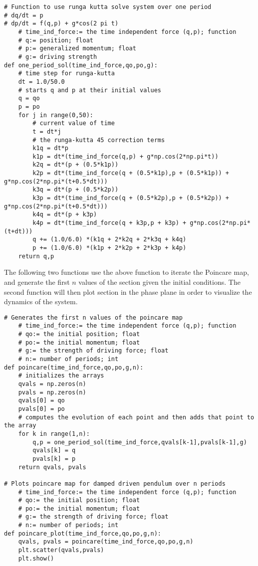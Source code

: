 \documentclass{article}
\begin{document}
\begin{lstlisting}
# Function to use runga kutta solve system over one period
# dq/dt = p
# dp/dt = f(q,p) + g*cos(2 pi t)
    # time_ind_force:= the time independent force (q,p); function
    # q:= position; float
    # p:= generalized momentum; float
    # g:= driving strength
def one_period_sol(time_ind_force,qo,po,g):
    # time step for runga-kutta
    dt = 1.0/50.0
    # starts q and p at their initial values
    q = qo
    p = po
    for j in range(0,50):
        # current value of time
        t = dt*j
        # the runga-kutta 45 correction terms
        k1q = dt*p
        k1p = dt*(time_ind_force(q,p) + g*np.cos(2*np.pi*t))
        k2q = dt*(p + (0.5*k1p))
        k2p = dt*(time_ind_force(q + (0.5*k1p),p + (0.5*k1p)) + g*np.cos(2*np.pi*(t+0.5*dt)))
        k3q = dt*(p + (0.5*k2p))
        k3p = dt*(time_ind_force(q + (0.5*k2p),p + (0.5*k2p)) + g*np.cos(2*np.pi*(t+0.5*dt)))
        k4q = dt*(p + k3p)
        k4p = dt*(time_ind_force(q + k3p,p + k3p) + g*np.cos(2*np.pi*(t+dt)))
        q += (1.0/6.0) *(k1q + 2*k2q + 2*k3q + k4q)
        p += (1.0/6.0) *(k1p + 2*k2p + 2*k3p + k4p)
    return q,p
\end{lstlisting}
The following two functions use the above function to iterate the Poincare map, and generate the first $n$ values of the section given the initial conditions. The second function will then plot section in the phase plane in order to visualize the dynamics of the system.
\begin{lstlisting}
# Generates the first n values of the poincare map
    # time_ind_force:= the time independent force (q,p); function
    # qo:= the initial position; float
    # po:= the initial momentum; float
    # g:= the strength of driving force; float
    # n:= number of periods; int
def poincare(time_ind_force,qo,po,g,n):
    # initializes the arrays
    qvals = np.zeros(n)
    pvals = np.zeros(n)
    qvals[0] = qo
    pvals[0] = po
    # computes the evolution of each point and then adds that point to the array
    for k in range(1,n):
        q,p = one_period_sol(time_ind_force,qvals[k-1],pvals[k-1],g)
        qvals[k] = q
        pvals[k] = p
    return qvals, pvals

# Plots poincare map for damped driven pendulum over n periods
    # time_ind_force:= the time independent force (q,p); function
    # qo:= the initial position; float
    # po:= the initial momentum; float
    # g:= the strength of driving force; float
    # n:= number of periods; int
def poincare_plot(time_ind_force,qo,po,g,n):
    qvals, pvals = poincare(time_ind_force,qo,po,g,n)
    plt.scatter(qvals,pvals)
    plt.show()
\end{lstlisting}
\end{document}
